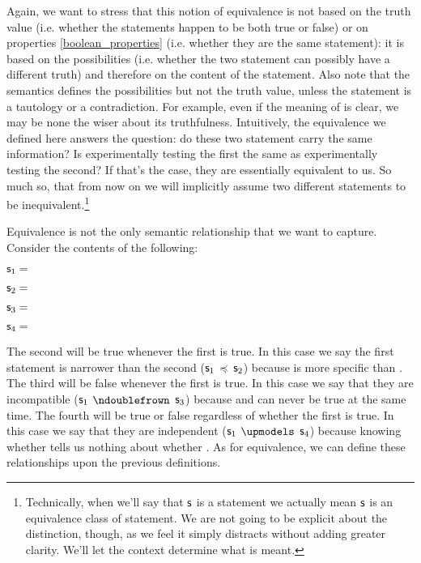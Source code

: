 \documentclass[11pt,letterpaper,fleqn]{memoir} %
\begin{document}
Again, we want to stress that this notion of equivalence is not based on the truth value (i.e. whether the statements happen to be both true or false) or on properties \ref{boolean_properties} (i.e. whether they are the same statement): it is based on the possibilities (i.e. whether the two statement can possibly have a different truth) and therefore on the content of the statement. Also note that the semantics defines the possibilities but not the truth value, unless the statement is a tautology or a contradiction. For example, even if the meaning of  is clear, we may be none the wiser about its truthfulness. Intuitively, the equivalence we defined here answers the question: do these two statement carry the same information? Is experimentally testing the first the same as experimentally testing the second? If that's the case, they are essentially equivalent to us. So much so, that from now on we will implicitly assume two different statements to be inequivalent.\footnote{Technically, when we'll say that $\mathsf{s}$ is a statement we actually mean $\mathsf{s}$ is an equivalence class of statement. We are not going to be explicit about the distinction, though, as we feel it simply distracts without adding greater clarity. We'll let the context determine what is meant.}

Equivalence is not the only semantic relationship that we want to capture. Consider the contents of the following:
\begin{description}
	\item $\mathsf{s}_1=$
	\item $\mathsf{s}_2=$
	\item $\mathsf{s}_3=$
	\item $\mathsf{s}_4=$
\end{description}
The second will be true whenever the first is true. In this case we say the first statement is narrower than the second ($\mathsf{s}_1$ $\preccurlyeq$ $\mathsf{s}_2$) because  is more specific than . The third will be false whenever the first is true. In this case we say that they are incompatible ($\mathsf{s}_1$ $\ncomp$ $\mathsf{s}_3$) because  and  can never be true at the same time. The fourth will be true or false regardless of whether the first is true. In this case we say that they are independent ($\mathsf{s}_1$ $\indep$ $\mathsf{s}_4$) because knowing whether  tells us nothing about whether . As for equivalence, we can define these relationships upon the previous definitions.
\end{document}
